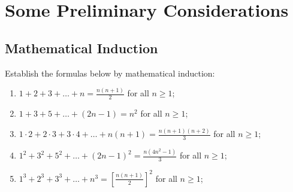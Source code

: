 \chapter{Some Preliminary Considerations}

\section{Mathematical Induction}

\begin{exercise}
    Establish the formulas below by mathematical induction:
    \begin{enumerate}
        \item $\displaystyle 1 + 2 + 3 + \dots + n = \frac{n(n+1)}{2}$ for all $n \geq 1$;
        \item $1  + 3 + 5 + \dots + (2n-1) = n^2$ for all $n \geq 1$;
        \item $\displaystyle 1\cdot 2 + 2\cdot 3 + 3\cdot 4 + \dots + n(n+1) = \frac{n(n+1)(n+2)}{3}$ for all $n \geq 1$;
        \item $\displaystyle 1^2 + 3^2 + 5^2 + \dots + (2n-1)^2 = \frac{n(4n^2 - 1)}{3}$ for all $n \geq 1$;
        \item $\displaystyle 1^3 + 2^3 + 3^3 + \dots + n^3 = \left[\frac{n(n+1)}{2}\right]^2$ for all $n \geq 1$; \\
    \end{enumerate}
\end{exercise}

